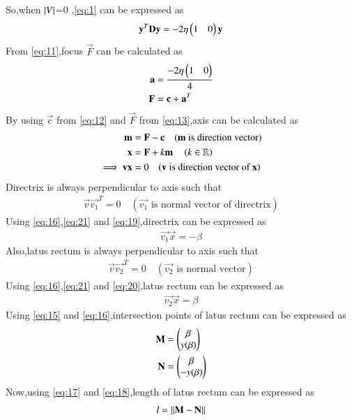 \documentclass[journal,12pt,twocolumn]{IEEEtran}
\begin{document}
So,when $\left\vert V\right\vert$=0 ,\eqref{eq:1} can be expressed as 
\begin{align}
\mathbf{y}^T\mathbf{D}\mathbf{y} = -2\eta\begin{pmatrix}1 & 0\end{pmatrix}\mathbf{y} \label{eq:11}
\end{align}
From \eqref{eq:11},focus $\vec{F}$ can be calculated as
\begin{align}
\mathbf{a} &= \frac{-2\eta\begin{pmatrix}1 & 0\end{pmatrix}}{4} 
\\
\mathbf{F} &= \mathbf{c} + \mathbf{a}^T  \label{eq:13}
\end{align}
By using $\vec{c}$ from \eqref{eq:12} and $\vec{F}$ from \eqref{eq:13},axis can be calculated as
\begin{align}
\mathbf{m} &= \mathbf{F}-\mathbf{c} \quad (\text{$\mathbf{m}$ is direction vector})
\\
\mathbf{x} &= \mathbf{F}+k\mathbf{m} \quad \left(k \in \mathbb{R}\right) \label{eq:14}
\\
\implies \mathbf{v}\mathbf{x} &= 0 \quad (\text{$\mathbf{v}$ is direction vector of $\mathbf{x}$}) \label{eq:21}
\end{align}
Directrix is always perpendicular to axis such that 
\begin{align}
\vec{v}\vec{v_1}^T = 0 \quad (\text{$\vec{v_1}$ is normal vector of directrix}) \label{eq:19}
\end{align}
Using \eqref{eq:16},\eqref{eq:21} and \eqref{eq:19},directrix can be expressed as 
\begin{align}
    \vec{v_1}\vec{x} = -\beta 
\end{align}
Also,latus rectum is always perpendicular to axis such that
\begin{align}
    \vec{v}\vec{v_2}^T = 0 \quad (\text{$\vec{v_2}$ is normal vector}) \label{eq:20}
\end{align}
Using \eqref{eq:16},\eqref{eq:21} and \eqref{eq:20},latus rectum can be expressed as \begin{align}
    \vec{v_2}\vec{x} = \beta 
\end{align}
Using \eqref{eq:15} and \eqref{eq:16},intersection points of latus rectum can be expressed as 
\begin{align}
    \mathbf{M}&=\begin{pmatrix}\beta \\ y(\beta)\end{pmatrix} \label{eq:17}
    \\
    \mathbf{N}&=\begin{pmatrix}\beta \\ -y(\beta)\end{pmatrix} \label{eq:18}
\end{align}
Now,using \eqref{eq:17} and \eqref{eq:18},length of latus rectum can be expressed as
\begin{align}
    l=\left\lVert\mathbf{M}-\mathbf{N}\right\rVert
\end{align}
\end{document}
